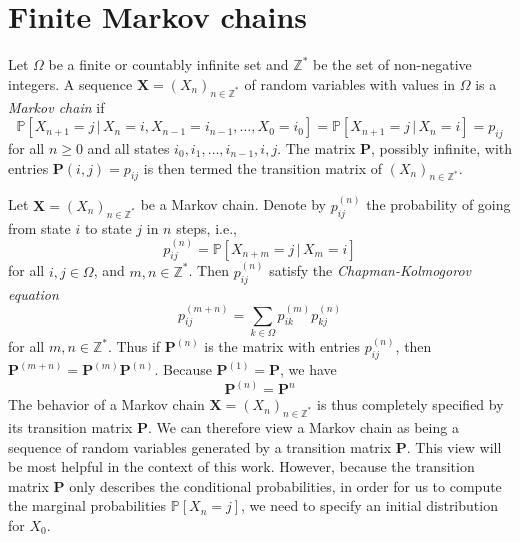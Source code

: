 \section{Finite Markov chains}
\label{sec:finite-markov-chain}
\begin{definition}
  \label{def:6}
  Let $\Omega$ be a finite or countably infinite set and
  $\mathbb{Z}^{*}$ be the set of non-negative integers. A sequence
  $\mathbf{X} = (X_n)_{n \in \mathbb{Z}^{*}}$ of random variables with values in
  $\Omega$ is a {\em Markov chain} if
  \begin{equation}
    \label{eq:8}
    \mathbb{P}[X_{n+1} = j \, | \, X_n = i, X_{n-1} = i_{n-1},
    \dots, X_0 = i_0] = \mathbb{P}[X_{n+1} = j \, | \, X_n = i] =
    p_{ij}
  \end{equation}
  for all $n \geq 0$ and all states $i_0, i_1, \dots, i_{n-1}, i,
  j$. The matrix $\mathbf{P}$, possibly infinite, with entries
  $\mathbf{P}(i,j) = p_{ij}$ is then termed the transition matrix of
  $(X_n)_{n \in \mathbb{Z}^*}$.
\end{definition}
Let $\mathbf{X} = (X_n)_{n \in \mathbb{Z}^*}$ be a Markov
chain. Denote by $p_{ij}^{(n)}$ the probability of going from state
$i$ to state $j$ in $n$ steps, i.e.,
\begin{equation}
  \label{eq:11}
  p_{ij}^{(n)} = \mathbb{P}[ X_{n + m } = j \, | \, X_m = i]
\end{equation}
for all $i, j \in \Omega$, and $m,n \in \mathbb{Z}^{*}$. Then
$p_{ij}^{(n)}$ satisfy the {\em Chapman-Kolmogorov equation}
\begin{equation}
  \label{eq:12}
  p_{ij}^{(m+n)} = \sum_{k \in \Omega}{p_{ik}^{(m)}p_{kj}^{(n)}}
\end{equation}
for all $m,n \in \mathbb{Z}^{*}$. Thus if $\mathbf{P}^{(n)}$ is the
matrix with entries $p_{ij}^{(n)}$, then $\mathbf{P}^{(m+n)} =
\mathbf{P}^{(m)}\mathbf{P}^{(n)}$. Because $\mathbf{P}^{(1)} =
\mathbf{P}$, we have
\begin{equation}
  \label{eq:13}
  \mathbf{P}^{(n)} = \mathbf{P}^{n}
\end{equation}
The behavior of a Markov chain $\mathbf{X} = (X_n)_{n \in
  \mathbb{Z}^{*}}$ is thus completely specified by its transition
matrix $\mathbf{P}$. We can therefore view a Markov chain as being a
sequence of random variables generated by a transition matrix
$\mathbf{P}$. This view will be most helpful in the context of this
work. However, because the transition matrix $\mathbf{P}$ only describes
the conditional probabilities, in order for us to compute the marginal
probabilities $\mathbb{P}[X_n = j]$, we need to specify an initial
distribution for $X_0$.

